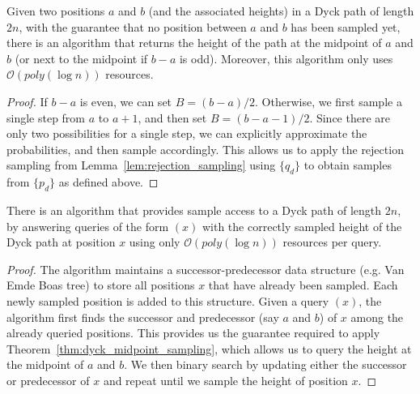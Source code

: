 \begin{theorem}
\label{thm:dyck_midpoint_sampling}
Given two positions $a$ and $b$ (and the associated heights) in a Dyck path of length $2n$,
with the guarantee that no position between $a$ and $b$ has been sampled yet,
there is an algorithm that returns the height of the path at the midpoint of $a$ and $b$ (or next to the midpoint if $b-a$ is odd).
Moreover, this algorithm only uses $\mathcal O(poly(\log n))$ resources.
\end{theorem}
\begin{proof}
If $b-a$ is even, we can set $B = (b-a)/2$.
Otherwise, we first sample a single step from $a$ to $a+1$, and then set $B = (b-a-1)/2$.
Since there are only two possibilities for a single step, we can explicitly approximate the probabilities, and then sample accordingly.
This allows us to apply the rejection sampling from Lemma~\ref{lem:rejection_sampling} using $\{ q_d\}$ to obtain samples from $\{ p_d\}$ as defined above.
\end{proof}

\begin{theorem}
\label{thm:dyck_height_sampling}
There is an algorithm that provides sample access to a Dyck path of length $2n$,
by answering queries of the form $(x)$ with the correctly sampled height of the Dyck path at position $x$
using only $\mathcal O(poly(\log n))$ resources per query.
\end{theorem}
\begin{proof}
The algorithm maintains a successor-predecessor data structure (e.g. Van Emde Boas tree) to store all positions $x$ that have already been sampled.
Each newly sampled position is added to this structure.
Given a query $(x)$, the algorithm first finds the successor and predecessor (say $a$ and $b$) of $x$ among the already queried positions.
This provides us the guarantee required to apply Theorem~\ref{thm:dyck_midpoint_sampling},
which allows us to query the height at the midpoint of $a$ and $b$.
We then binary search by updating either the successor or predecessor of $x$ and repeat until we sample the height of position $x$.
\end{proof}




